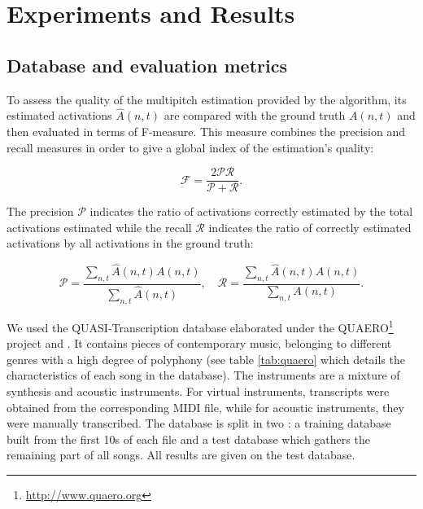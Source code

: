 \documentclass{article}
\begin{document}
\pagebreak

\section{Experiments and Results}
\label{sec:expres}

\vspace{0.2cm}

\subsection{Database and evaluation metrics}

\vspace{0.1cm}

To assess the quality of the multipitch estimation provided by the algorithm, %
its estimated activations $\hat{A}(n,t)$ are compared with the ground truth $A(n,t)$ and then evaluated in terms of F-measure. This measure combines the precision and recall measures in order to give a global index of the estimation's quality:

\vspace{0.1cm}

$$\mathcal{F}  = \frac{2\mathcal{P}\mathcal{R}}{\mathcal{P}+\mathcal{R}}.$$ 

\vspace{0.2cm}

The precision $\mathcal{P}$ indicates the ratio of activations correctly estimated by the total activations estimated while the recall $\mathcal{R}$ indicates the ratio of correctly estimated activations by all activations in the ground truth: 

\vspace{0.1cm}

$$\mathcal{P}  = \frac{\sum_{n,t}\hat{A}(n,t)A(n,t)}{\sum_{n,t}\hat{A}(n,t)}, \quad \mathcal{R}  = \frac{\sum_{n,t}\hat{A}(n,t)A(n,t)}{\sum_{n,t}A(n,t)}.$$ 

\vspace{0.2cm}

We used the QUASI-Transcription database elaborated under the QUAERO\footnote{\url{http://www.quaero.org}} project and \cite{Fuentes2013_PhD}. It contains pieces of contemporary music, belonging to different genres with a high degree of polyphony (see table \ref{tab:quaero} which details the characteristics of each song in the database). The instruments are a mixture of synthesis and acoustic instruments. For virtual instruments, transcripts were obtained from the corresponding MIDI file, while for acoustic instruments, they were manually transcribed. 
The database is split in two : a training database built from the first 10s of each file and a test database  which gathers the remaining part of all songs. All results are given on the test database.
\end{document}
